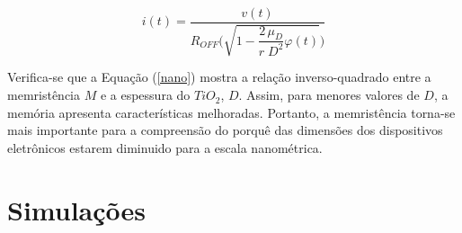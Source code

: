 \documentclass{ceel}
\begin{document}
\begin{multicols}{2}
\begin{equation}\label{i}
i(t)=\dfrac{v(t)}{R_{OFF}\Bigg(\sqrt{1-\dfrac{2\, \mu_D}{r\; D^2}\varphi(t) }\Bigg)}
\end{equation} 
\vspace{0.05cm}

Verifica-se que a Equação (\ref{nano}) mostra a relação inverso-quadrado entre a memristência $M$ e a espessura do $TiO_2$, $D$. Assim, para menores valores de $D$, a memória apresenta características melhoradas. Portanto, a memristência torna-se mais importante para a compreensão do porquê das dimensões dos dispositivos eletrônicos estarem diminuido para a escala nanométrica.

\section{Simulações} \label{sim}

\begin{figure}[H]
\centering


\end{figure}
\end{multicols}
\end{document}
